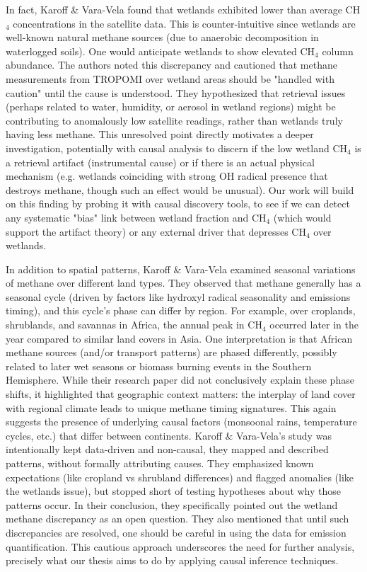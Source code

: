 In fact, Karoff \& Vara-Vela found that wetlands exhibited lower than average CH$_4$ concentrations in the satellite data. This is counter-intuitive since wetlands are well-known natural methane sources (due to anaerobic decomposition in waterlogged soils). One would anticipate wetlands to show elevated CH$_4$ column abundance. The authors noted this discrepancy and cautioned that methane measurements from TROPOMI over wetland areas should be "handled with caution" until the cause is understood. They hypothesized that retrieval issues (perhaps related to water, humidity, or aerosol in wetland regions) might be contributing to anomalously low satellite readings, rather than wetlands truly having less methane. This unresolved point directly motivates a deeper investigation, potentially with causal analysis to discern if the low wetland CH$_4$ is a retrieval artifact (instrumental cause) or if there is an actual physical mechanism (e.g. wetlands coinciding with strong OH radical presence that destroys methane, though such an effect would be unusual). Our work will build on this finding by probing it with causal discovery tools, to see if we can detect any systematic "bias" link between wetland fraction and CH$_4$ (which would support the artifact theory) or any external driver that depresses CH$_4$ over wetlands.

In addition to spatial patterns, Karoff \& Vara-Vela examined seasonal variations of methane over different land types. They observed that methane generally has a seasonal cycle (driven by factors like hydroxyl radical seasonality and emissions timing), and this cycle's phase can differ by region. For example, over croplands, shrublands, and savannas in Africa, the annual peak in CH$_4$ occurred later in the year compared to similar land covers in Asia. One interpretation is that African methane sources (and/or transport patterns) are phased differently, possibly related to later wet seasons or biomass burning events in the Southern Hemisphere. While their research paper did not conclusively explain these phase shifts, it highlighted that geographic context matters: the interplay of land cover with regional climate leads to unique methane timing signatures. This again suggests the presence of underlying causal factors (monsoonal rains, temperature cycles, etc.) that differ between continents. Karoff \& Vara-Vela's study was intentionally kept data-driven and non-causal, they mapped and described patterns, without formally attributing causes. They emphasized known expectations (like cropland vs shrubland differences) and flagged anomalies (like the wetlands issue), but stopped short of testing hypotheses about why those patterns occur. In their conclusion, they specifically pointed out the wetland methane discrepancy as an open question. They also mentioned that until such discrepancies are resolved, one should be careful in using the data for emission quantification. This cautious approach underscores the need for further analysis, precisely what our thesis aims to do by applying causal inference techniques.

